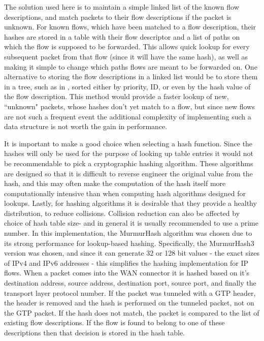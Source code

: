 The solution used here is to maintain a simple linked list of the known flow descriptions, and match packets to their flow descriptions if the packet is unknown. For known flows, which have been matched to a flow description, their hashes are stored in a table with their flow descriptor and a list of paths on which the flow is supposed to be forwarded. This allows quick lookup for every subsequent packet from that flow (since it will have the same hash), as well as making it simple to change which paths flows are meant to be forwarded on. One alternative to storing the flow descriptions in a linked list would be to store them in a tree, such as in \cite{tongaonkar2004fast}, sorted either by priority, ID, or even by the hash value of the flow description. This method would provide a faster lookup of new, “unknown" packets, whose hashes don't yet match to a flow, but since new flows are not such a frequent event the additional complexity of implementing such a data structure is not worth the gain in performance.

It is important to make a good choice when selecting a hash function. Since the hashes will only be used for the purpose of looking up table entries it would not be recommendable to pick a cryptographic hashing algorithm. These algorithms are designed so that it is difficult to reverse engineer the original value from the hash, and this may often make the computation of the hash itself more computationally intensive than when computing hash algorithms designed for lookups. Lastly, for hashing algorithms it is desirable that they provide a healthy distribution, to reduce collisions. Collision reduction can also be affected by choice of hash table size- and in general it is usually recommended to use a prime number. In this implementation, the MurmurHash algorithm was chosen due to its strong performance for lookup-based hashing. Specifically, the MurmurHash3 \cite{appleby2012murmurhash3} version was chosen, and since it can generate 32 or 128 bit values - the exact sizes of IPv4 and IPv6 addresses - this simplifies the hashing implementation for IP flows. When a packet comes into the WAN connector it is hashed based on it's destination address, source address, destination port, source port, and finally the transport layer protocol number. If the packet was tunneled with a GTP header, the header is removed and the hash is performed on the tunneled packet, not on the GTP packet. If the hash does not match, the packet is compared to the list of existing flow descriptions. If the flow is found to belong to one of these descriptions then that decision is stored in the hash table.






























